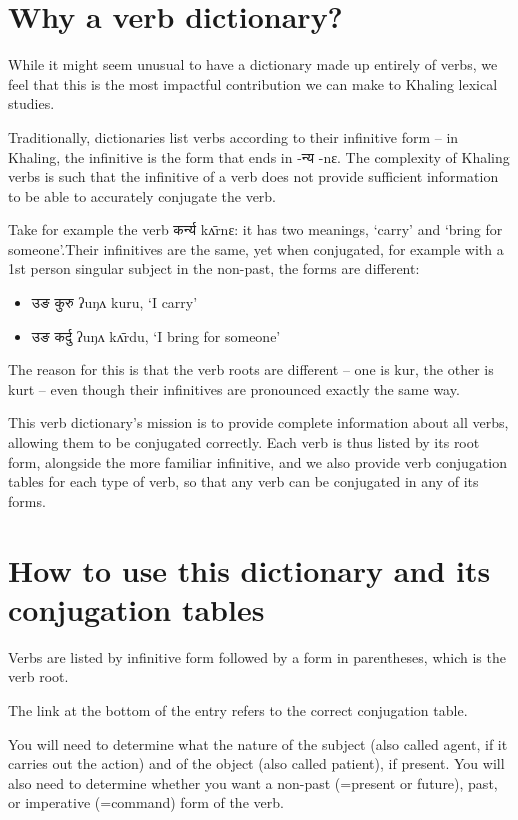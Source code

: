 \documentclass[oldfontcommands,oneside,a4paper,11pt]{article}
\newcommand{\ipa}[1]{{\phon #1}} %
\begin{document}
 

\section{Why a verb dictionary?}

While it might seem unusual to have a dictionary made up entirely of verbs, we feel that this is the most impactful contribution we can make to Khaling lexical studies.

Traditionally, dictionaries list verbs according to their infinitive form -- in Khaling, the infinitive is the form that ends in -न्य \ipa{-nɛ}.  The complexity of Khaling verbs is such that the infinitive of a verb does not provide sufficient information  to be able to accurately conjugate the verb.

Take for example the verb कर्न्य \ipa{kʌ̄rnɛ}: it has two meanings, `carry' and `bring for someone'.Their infinitives are the same, yet when conjugated, for example with a 1st person singular subject in the non-past, the forms are different:

\begin{itemize}
\item उङ कुरु  \ipa{ʔuŋʌ kuru}, `I carry'
\item उङ कर्दु \ipa{ʔuŋʌ kʌ̄rdu}, `I bring for someone'
\end{itemize}

The reason for this is that the verb roots are different -- one is \ipa{kur}, the other is \ipa{kurt} -- even though their infinitives are pronounced exactly the same way.

This verb dictionary's mission is to provide complete information about all verbs, allowing them to be conjugated correctly. Each verb is thus listed by its root form, alongside the more familiar infinitive, and we also provide verb conjugation tables for each type of verb, so that any verb can be conjugated in any of its forms.
 
\section{How to use this dictionary and its conjugation tables}
Verbs are listed by infinitive form followed by a form in parentheses, which is the verb root.

The link at the bottom of the entry refers to the correct conjugation table.

You will need to determine what the nature of the subject (also called agent, if it carries out the action) and of the object (also called patient), if present.  You will also need to determine whether you want a non-past (=present or future), past, or imperative (=command) form of the verb.
\end{document}
